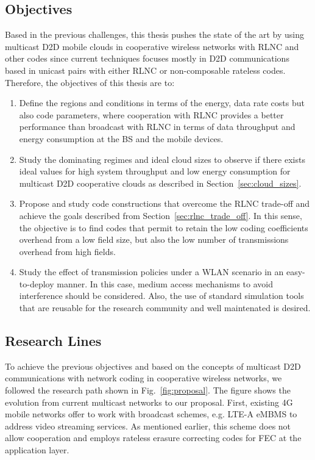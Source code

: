 \subsection{Objectives}
Based in the previous challenges, this thesis pushes the state of the art by using multicast \ac{D2D} mobile clouds in cooperative wireless networks with \ac{RLNC} and other codes since current techniques focuses mostly in \ac{D2D} communications based in unicast pairs with either \ac{RLNC} or non-composable rateless codes. Therefore, the objectives of this thesis are to:

\begin{enumerate}

\item Define the regions and conditions in terms of the energy, data rate costs but also code parameters, where cooperation with \ac{RLNC} provides a better performance than broadcast with \ac{RLNC} in terms of data throughput and energy consumption at the \ac{BS} and the mobile devices.

\item Study the dominating regimes and ideal cloud sizes to observe if there exists ideal values for high system throughput and low energy consumption for multicast \ac{D2D} cooperative clouds as described in Section~\ref{sec:cloud_sizes}.

\item Propose and study code constructions that overcome the \ac{RLNC} trade-off and achieve the goals described from Section~\ref{sec:rlnc_trade_off}. In this sense, the objective is to find codes that permit to retain the low coding coefficients overhead from a low field size, but also the low number of transmissions overhead from high fields.

\item Study the effect of transmission policies under a \ac{WLAN} scenario in an easy-to-deploy manner. In this case, medium access mechanisms to avoid interference should be considered. Also, the use of standard simulation tools that are reusable for the research community and well maintenated is desired.

\end{enumerate}

\subsection{Research Lines}

To achieve the previous objectives and based on the concepts of multicast \ac{D2D} communications with network coding in cooperative wireless networks, we followed the research path shown in Fig.~\ref{fig:proposal}. The figure shows the evolution from current multicast networks to our proposal. First, existing 4G mobile networks offer to work with broadcast schemes, e.g. \ac{LTE-A} \ac{eMBMS} to address video streaming services. As mentioned earlier, this scheme does not allow cooperation and employs rateless erasure correcting codes for \ac{FEC} at the application layer.

